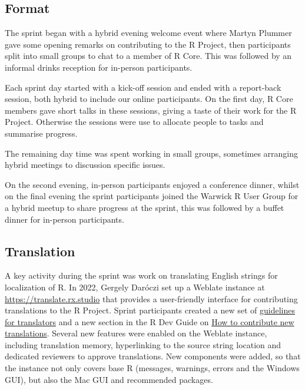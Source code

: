 \hypertarget{format}{%
\subsection{Format}\label{format}}

The sprint began with a hybrid evening welcome event where Martyn Plummer gave some opening remarks on contributing to the R Project, then participants split into small groups to chat to a member of R Core. This was followed by an informal drinks reception for in-person participants.

Each sprint day started with a kick-off session and ended with a report-back session, both hybrid to include our online participants. On the first day, R Core members gave short talks in these sessions, giving a taste of their work for the R Project. Otherwise the sessions were use to allocate people to tasks
and summarise progress.

The remaining day time was spent working in small groups, sometimes arranging
hybrid meetings to discussion specific issues.

On the second evening, in-person participants enjoyed a conference dinner, whilst on the final evening the sprint participants joined the Warwick R User
Group for a hybrid meetup to share progress at the sprint, this was followed by a buffet dinner for in-person participants.

\hypertarget{translation}{%
\subsection{Translation}\label{translation}}

A key activity during the sprint was work on translating English strings for
localization of R. In 2022, Gergely Daróczi set up a Weblate instance at
\url{https://translate.rx.studio} that provides a user-friendly interface for
contributing translations to the R Project. Sprint participants created a new
set of \href{https://contributor.r-project.org/translations/}{guidelines for translators} and
a new section in the R Dev Guide on \href{https://contributor.r-project.org/rdevguide/message-translations.html\#how-to-contribute-new-translations}{How to contribute new translations}. Several new features were enabled on the Weblate instance,
including translation memory, hyperlinking to the source string location and
dedicated reviewers to approve translations. New components were added, so that
the instance not only covers base R (messages, warnings, errors and the
Windows GUI), but also the Mac GUI and recommended packages.

